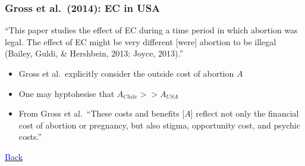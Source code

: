 \documentclass[10pt,letterpaper,subeqn]{beamer}
\begin{document}
\begin{frame}[label=GrossEtAl]
\frametitle{Gross et al.\ (2014): EC in USA}
``This paper studies the effect of EC during a time period in which abortion was legal. 
The effect of EC might be very different [were] abortion to be illegal 
(Bailey, Guldi, \& Hershbein, 2013; Joyce, 2013).''
\vspace{6mm}
\begin{itemize}
\item Gross et al.\ explicitly consider the outside cost of abortion $A$
\item One may hyptohesise that $A_{Chile}>>A_{USA}$
\item From Gross et al.\ ``These costs and benefits [$A$] reflect not only the financial 
cost of abortion or pregnancy, but also stigma, opportunity cost, and psychic costs.''
\vspace{7mm}
\end{itemize}
\hyperlink{empirA3}{\textcolor{blue}{Back}}
\end{frame}
\end{document}
